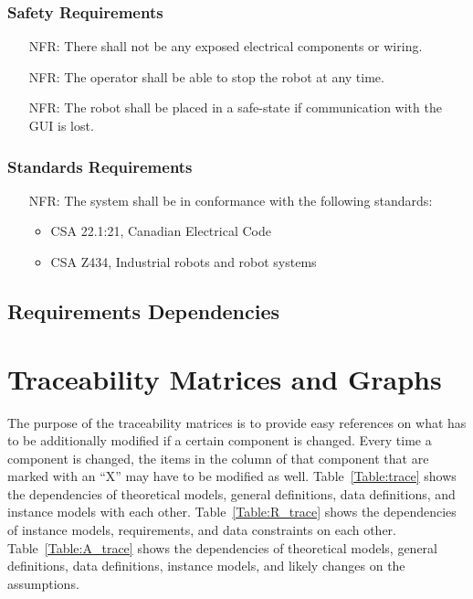 \documentclass[12pt]{article}
\newcounter{nfrnum} %
\begin{document}
\subsubsection{Safety Requirements}
\noindent \begin{itemize}
\item[NFR\refstepcounter{nfrnum}\thenfrnum \label{NFR_Safety1}:] There shall not be any exposed electrical components or wiring.
\item[NFR\refstepcounter{nfrnum}\thenfrnum \label{NFR_Safety2}:] The operator shall be able to stop the robot at any time.
\item[NFR\refstepcounter{nfrnum}\thenfrnum \label{NFR_Safety3}:] The robot shall be placed in a safe-state if communication with the GUI is lost.
\end{itemize}

\subsubsection{Standards Requirements}
\noindent \begin{itemize}
\item[NFR\refstepcounter{nfrnum}\thenfrnum \label{NFR_Safety1}:] The system shall be in conformance with the following standards:
\begin{itemize}
\item CSA 22.1:21, Canadian Electrical Code \cite{CSA1}
\item CSA Z434, Industrial robots and robot systems \cite{CSA2}
\end{itemize}
\end{itemize}

\subsection{Requirements Dependencies}
\section{Traceability Matrices and Graphs}
\label{sec_tm}

The purpose of the traceability matrices is to provide easy references on what
has to be additionally modified if a certain component is changed.  Every time a
component is changed, the items in the column of that component that are marked
with an ``X'' may have to be modified as well.  Table~\ref{Table:trace} shows the
dependencies of theoretical models, general definitions, data definitions, and
instance models with each other. Table~\ref{Table:R_trace} shows the
dependencies of instance models, requirements, and data constraints on each
other. Table~\ref{Table:A_trace} shows the dependencies of theoretical models,
general definitions, data definitions, instance models, and likely changes on
the assumptions.
\end{document}
